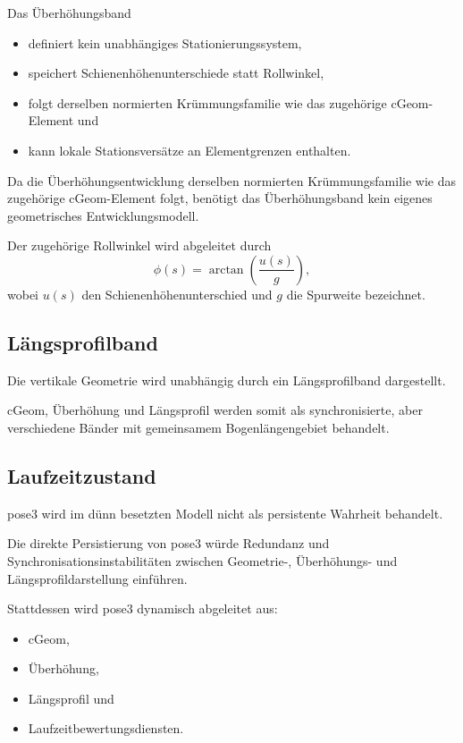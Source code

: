 Das Überhöhungsband
\begin{itemize}
\item definiert kein unabhängiges Stationierungssystem,
\item speichert Schienenhöhenunterschiede statt Rollwinkel,
\item folgt derselben normierten Krümmungsfamilie wie das zugehörige
cGeom-Element und
\item kann lokale Stationsversätze an Elementgrenzen enthalten.
\end{itemize}

Da die Überhöhungsentwicklung derselben normierten Krümmungsfamilie wie das
zugehörige cGeom-Element folgt, benötigt das Überhöhungsband kein eigenes
geometrisches Entwicklungsmodell.

Der zugehörige Rollwinkel wird abgeleitet durch
\[
\phi(s)=\arctan\!\left(\frac{u(s)}{g}\right),
\]
wobei \(u(s)\) den Schienenhöhenunterschied und \(g\) die Spurweite bezeichnet.

\subsection{Längsprofilband}

\begin{definition}[Längsprofilband]
Die vertikale Geometrie wird unabhängig durch ein Längsprofilband dargestellt.
\end{definition}

cGeom, Überhöhung und Längsprofil werden somit als synchronisierte, aber
verschiedene Bänder mit gemeinsamem Bogenlängengebiet behandelt.

\subsection{Laufzeitzustand}

\begin{proposition}
pose3 wird im dünn besetzten Modell nicht als persistente Wahrheit behandelt.
\end{proposition}

Die direkte Persistierung von pose3 würde Redundanz und
Synchronisationsinstabilitäten zwischen Geometrie-, Überhöhungs- und
Längsprofildarstellung einführen.

Stattdessen wird pose3 dynamisch abgeleitet aus:
\begin{itemize}
\item cGeom,
\item Überhöhung,
\item Längsprofil und
\item Laufzeitbewertungsdiensten.
\end{itemize}

